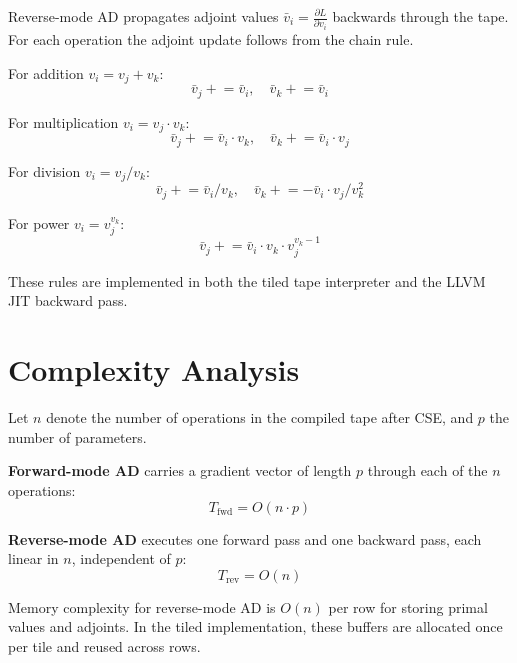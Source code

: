\documentclass[12pt]{report}
\begin{document}
Reverse-mode AD propagates adjoint values $\bar{v}_i =
\frac{\partial L}{\partial v_i}$ backwards through the tape. For
each operation the adjoint update follows from the chain rule.

For addition $v_i = v_j + v_k$:
\begin{equation}
\bar{v}_j \mathrel{+}= \bar{v}_i, \quad \bar{v}_k \mathrel{+}= \bar{v}_i
\end{equation}

For multiplication $v_i = v_j \cdot v_k$:
\begin{equation}
\bar{v}_j \mathrel{+}= \bar{v}_i \cdot v_k, \quad
\bar{v}_k \mathrel{+}= \bar{v}_i \cdot v_j
\end{equation}

For division $v_i = v_j / v_k$:
\begin{equation}
\bar{v}_j \mathrel{+}= \bar{v}_i / v_k, \quad
\bar{v}_k \mathrel{+}= -\bar{v}_i \cdot v_j / v_k^2
\end{equation}

For power $v_i = v_j^{v_k}$:
\begin{equation}
\bar{v}_j \mathrel{+}= \bar{v}_i \cdot v_k \cdot v_j^{v_k - 1}
\end{equation}

These rules are implemented in both the tiled tape interpreter and
the LLVM JIT backward pass.

\section{Complexity Analysis}

Let $n$ denote the number of operations in the compiled tape after
CSE, and $p$ the number of parameters.

\textbf{Forward-mode AD} carries a gradient vector of length $p$
through each of the $n$ operations:
\begin{equation}
T_{\text{fwd}} = O(n \cdot p)
\end{equation}

\textbf{Reverse-mode AD} executes one forward pass and one backward
pass, each linear in $n$, independent of $p$:
\begin{equation}
T_{\text{rev}} = O(n)
\end{equation}

Memory complexity for reverse-mode AD is $O(n)$ per row for storing
primal values and adjoints. In the tiled implementation, these buffers
are allocated once per tile and reused across rows.
\end{document}
